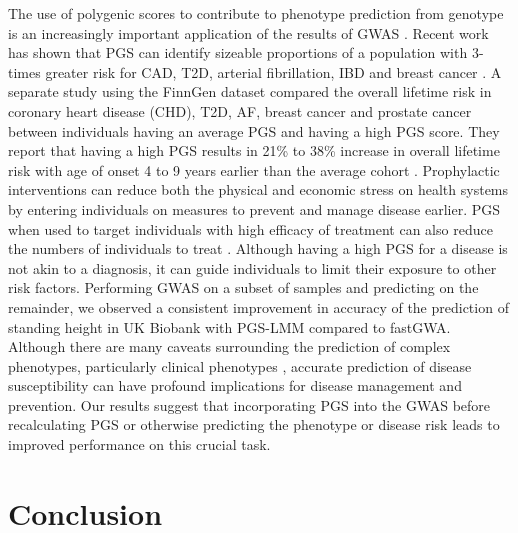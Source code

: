 \documentclass[doublespacing]{bmcart}
\begin{document}

The use of polygenic scores to contribute to phenotype prediction from genotype is an increasingly important application of the results of GWAS \cite{martin2019predicting}. Recent work has shown that PGS can identify sizeable proportions of a population with 3-times greater risk for CAD, T2D, arterial fibrillation, IBD and breast cancer \cite{khera2018genome}. A separate study using the FinnGen dataset compared the overall lifetime risk in coronary heart disease (CHD), T2D, AF, breast cancer and prostate cancer between individuals having an average PGS and having a high PGS score. They report that having a high PGS results in 21\% to 38\% increase in overall lifetime risk with age of onset 4 to 9 years earlier than the average cohort \cite{mars2020polygenic}. Prophylactic interventions can reduce both the physical and economic stress on health systems by entering individuals on measures to prevent and manage disease earlier. PGS when used to target individuals with high efficacy of treatment can also reduce the numbers of individuals to treat \cite{gibson2019utilization}. Although having a high PGS for a disease is not akin to a diagnosis, it can guide individuals to limit their exposure to other risk factors. Performing GWAS on a subset of samples and predicting on the remainder, we observed a consistent improvement in accuracy of the prediction of standing height in UK Biobank with PGS-LMM compared to fastGWA. Although there are many caveats surrounding the prediction of complex phenotypes, particularly clinical phenotypes \cite{duncan2019analysis}, accurate prediction of disease susceptibility can have profound implications for disease management and prevention. Our results suggest that incorporating PGS into the GWAS before recalculating PGS or otherwise predicting the phenotype or disease risk leads to improved performance on this crucial task.


\section*{Conclusion}
\end{document}
